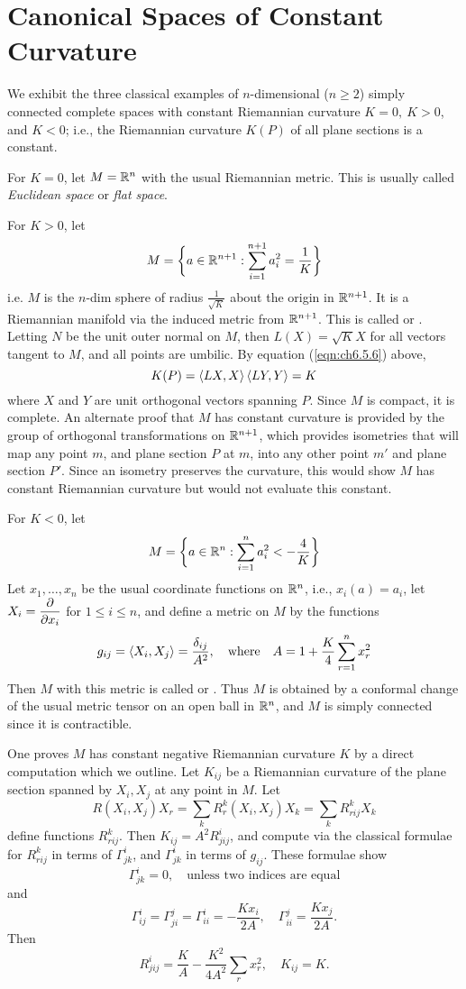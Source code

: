 \documentclass[../main]{subfiles}
\begin{document}
\section{Canonical Spaces of Constant Curvature}\label{ch06:s7}

We exhibit the three classical examples of $n$-dimensional ($n\ge2$) simply connected complete spaces with constant Riemannian curvature $K=0,~K>0$, and $K<0$; i.e., the Riemannian curvature $K(P)$ of all plane sections is a constant.

For $K=0$, let $M=\mathbb{R}^n$ with the usual Riemannian metric. This is usually called \emph{Euclidean space} or \emph{flat space}.

For $K>0$, let
\[M = \bigg\{a\in\mathbb{R}^{n+1}: \sum_{i=1}^{n+1} a_i^2 = \frac1K\bigg\}\]
i.e. $M$ is the $n$-dim sphere of radius $\frac{1}{\sqrt K}$ about the origin in $\mathbb{R}^{n+1}$. It is a Riemannian manifold via the induced metric from $\mathbb{R}^{n+1}$. This is called  or . Letting $N$ be the unit outer normal on $M$, then $L(X)=\sqrt KX$ for all vectors tangent to $M$, and all points are umbilic. By equation (\ref{eqn:ch6.5.6}) above,
\[K(P) = \left\langle LX,X\right\rangle\left\langle LY,Y\right\rangle = K\]
where $X$ and $Y$ are unit orthogonal vectors spanning $P$. Since $M$ is compact, it is complete. An alternate proof that $M$ has constant curvature is provided by the group of orthogonal transformations on $\mathbb{R}^{n+1}$, which provides isometries that will map any point $m$, and plane section $P$ at $m$, into any other point $m'$ and plane section $P'$. Since an isometry preserves the curvature, this would show $M$ has constant Riemannian curvature but would not evaluate this constant.

For $K<0$, let
\[M = \bigg\{a\in\mathbb{R}^{n}: \sum_{i=1}^{n} a_i^2 < -\frac4K\bigg\}\]
Let $x_1,\ldots,x_n$ be the usual coordinate functions on $\mathbb{R}^n$, i.e., $x_i(a)=a_i$, let $X_i=\dfrac{\partial }{\partial x_i}$ for $1\le i\le n$, and define a metric on $M$ by the functions
\[g_{ij} = \left\langle X_i,X_j\right\rangle = \frac{\delta_{ij}}{A^2},
\quad \text{where}
\quad A = 1+\frac K4\sum_{r=1}^n x_r^2\]
Then $M$ with this metric is called  or . Thus $M$ is obtained by a conformal change of the usual metric tensor on an open ball in $\mathbb{R}^n$, and $M$ is simply connected since it is contractible.

One proves $M$ has constant negative Riemannian curvature $K$ by a direct computation which we outline. Let $K_{ij}$ be a Riemannian curvature of the plane section spanned by $X_i,X_j$ at any point in $M$. Let
\[R(X_i,X_j)X_r = \sum_k R_r^k(X_i,X_j)X_k = \sum_k R_{rij}^kX_k\]
define functions $R_{rij}^k$. Then $K_{ij}=A^2R_{jij}^i$, and compute via the classical formulae for $R_{rij}^k$ in terms of $\Gamma_{jk}^i$, and $\Gamma_{jk}^i$ in terms of $g_{ij}$. These formulae show
\[\Gamma_{jk}^i=0,
\quad \text{unless two indices are equal}\]
and
\[\Gamma_{ij}^i = \Gamma_{ji}^j = \Gamma_{ii}^i = -\frac{Kx_i}{2A},
\quad \Gamma_{ii}^j=\frac{Kx_j}{2A}.\]
Then
\[R_{jij}^i = \frac KA - \frac{K^2}{4A^2}\sum_rx_r^2,
\quad K_{ij} = K.\]
\end{document}

